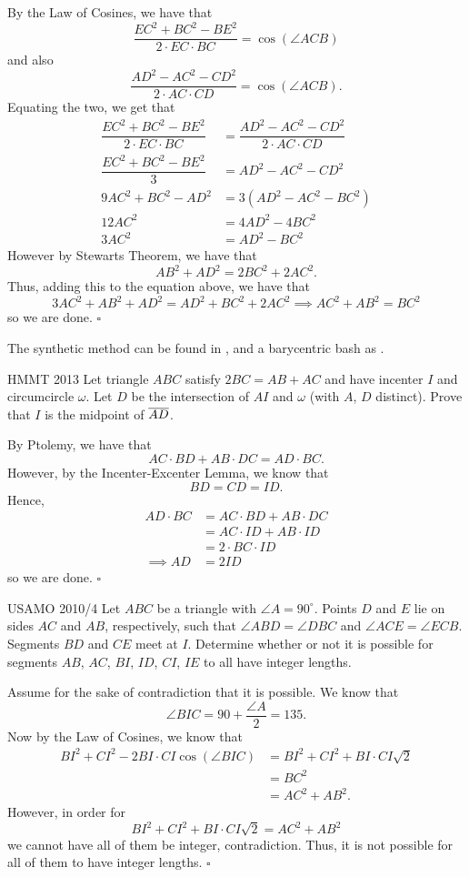 \documentclass{article}
\begin{document}
By the Law of Cosines, we have that \[\dfrac{EC^2+BC^2-BE^2}{2\cdot EC\cdot BC} = \cos(\angle ACB)\] and also \[\dfrac{AD^2-AC^2-CD^2}{2\cdot AC\cdot CD} = \cos(\angle ACB).\] Equating the two, we get that
\begin{align*}
\dfrac{EC^2+BC^2-BE^2}{2\cdot EC\cdot BC} &= \dfrac{AD^2-AC^2-CD^2}{2\cdot AC\cdot CD} \\
\dfrac{EC^2+BC^2-BE^2}{3} &= AD^2-AC^2-CD^2 \\
9AC^2+BC^2-AD^2 &= 3(AD^2-AC^2-BC^2) \\
12AC^2 &= 4AD^2-4BC^2 \\
3AC^2 &= AD^2-BC^2
\end{align*}
However by Stewarts Theorem, we have that \[AB^2+AD^2=2BC^2+2AC^2.\] Thus, adding this to the equation above, we have that \[3AC^2+AB^2+AD^2 = AD^2+BC^2+2AC^2 \implies AC^2+AB^2 = BC^2\] so we are done. $\square$
\begin{remark*}
The synthetic method can be found in , and a barycentric bash as .
\end{remark*}

\begin{problem}[5.20]{HMMT 2013}
Let triangle $ABC$ satisfy $2BC = AB + AC$ and have incenter $I$ and circumcircle $\omega$. Let $D$ be the intersection of $AI$ and $\omega$ (with $A$, $D$ distinct). Prove that $I$ is the midpoint of $\overline{AD}$.
\end{problem}

By Ptolemy, we have that \[AC\cdot BD + AB\cdot DC = AD\cdot BC.\] However, by the Incenter-Excenter Lemma, we know that \[BD = CD = ID.\] Hence,
\begin{align*}
AD\cdot BC &= AC\cdot BD + AB\cdot DC \\
&= AC\cdot ID + AB\cdot ID \\
&= 2\cdot BC\cdot ID \\
\implies AD &= 2ID
\end{align*}
so we are done. $\square$

\begin{problem}[5.21]{USAMO 2010/4}
Let $ABC$ be a triangle with $\angle A = 90^\circ$. Points $D$ and $E$ lie on sides $AC$ and $AB$, respectively, such that $\angle ABD = \angle DBC$ and $\angle ACE = \angle ECB$. Segments $BD$ and $CE$ meet at $I$. Determine whether or not it is possible for segments $AB$, $AC$, $BI$, $ID$, $CI$, $IE$ to all have integer lengths.
\end{problem}

Assume for the sake of contradiction that it is possible. We know that \[\angle BIC = 90+\dfrac{\angle A}{2} = 135.\] Now by the Law of Cosines, we know that 
\begin{align*}
BI^2+CI^2-2BI\cdot CI\cos(\angle BIC) &= BI^2+CI^2+BI\cdot CI\sqrt{2} \\
&= BC^2 \\
&= AC^2+AB^2.
\end{align*}
However, in order for \[BI^2+CI^2+BI\cdot CI\sqrt{2}= AC^2+AB^2\] we cannot have all of them be integer, contradiction. Thus, it is not possible for all of them to have integer lengths. $\square$
\end{document}
